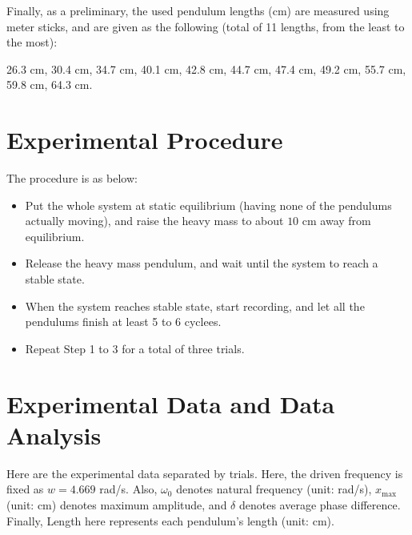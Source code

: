 \documentclass{article}
\begin{document}
Finally, as a preliminary, the used pendulum lengths (cm) are measured using meter sticks, and are given as the following (total of 11 lengths, from the least to the most):

26.3 cm, 30.4 cm, 34.7 cm, 40.1 cm, 42.8 cm, 44.7 cm, 47.4 cm, 49.2 cm, 55.7 cm, 59.8 cm, 64.3 cm.


\hfil

\section{Experimental Procedure}
The procedure is as below:
\begin{itemize}
    \item[1.] Put the whole system at static equilibrium (having none of the pendulums actually moving), and raise the heavy mass to about $10$ cm away from equilibrium.
    \item[2.] Release the heavy mass pendulum, and wait until the system to reach a stable state.
    \item[3.] When the system reaches stable state, start recording, and let all the pendulums finish at least 5 to 6 cyclees.  
    \item[4.] Repeat Step 1 to 3 for a total of three trials. 
\end{itemize}

\hfil

\section{Experimental Data and Data Analysis}
Here are the experimental data separated by trials. Here, the driven frequency is fixed as $w=4.669$ rad/s. Also, $\omega_0$ denotes natural frequency (unit: rad/s), $x_{\max}$ (unit: cm) denotes maximum amplitude, and $\delta$ denotes average phase difference. Finally, Length here represents each pendulum's length (unit: cm).
\end{document}
